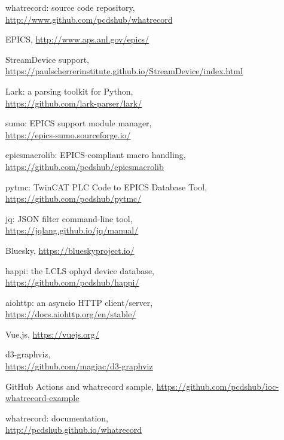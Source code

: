 \documentclass[letter,
               keeplastbox,   %
               ]{jacow}
\begin{document}
%
	{\printbibliography}%
	{%
	
	\begin{thebibliography}{99} %
	
    	whatrecord: source code repository,\\
		\url{http://www.github.com/pcdshub/whatrecord}
	
		EPICS,
		\url{http://www.aps.anl.gov/epics/}
	
		StreamDevice support,\\
		\url{https://paulscherrerinstitute.github.io/StreamDevice/index.html}
	
		Lark: a parsing toolkit for Python,\\
		\url{https://github.com/lark-parser/lark/}
	
		sumo: EPICS support module manager,\\
		\url{https://epics-sumo.sourceforge.io/}
	
    	epicsmacrolib: EPICS-compliant macro handling,\\
		\url{https://github.com/pcdshub/epicsmacrolib}
	
   		pytmc: TwinCAT PLC Code to EPICS Database Tool,\\
		\url{https://github.com/pcdshub/pytmc/}

		jq: JSON filter command-line tool,\\
		\url{https://jqlang.github.io/jq/manual/}
	
    Bluesky,
		\url{https://blueskyproject.io/}
	
    happi: the LCLS ophyd device database,\\
    \url{https://github.com/pcdshub/happi/}

		aiohttp: an asyncio HTTP client/server,\\
		\url{https://docs.aiohttp.org/en/stable/}
	
    Vue.js,
		\url{https://vuejs.org/}
	
    d3-graphviz,\\
		\url{https://github.com/magjac/d3-graphviz}
	
		GitHub Actions and whatrecord sample,
		\url{https://github.com/pcdshub/ioc-whatrecord-example}
	
    	whatrecord: documentation,\\
		\url{http://pcdshub.github.io/whatrecord}
	
	\end{thebibliography}
} %

%
% 

\end{document}
